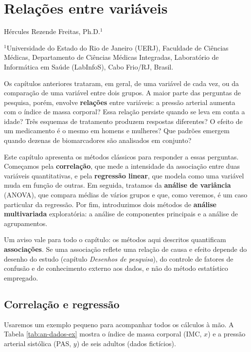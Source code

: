 \documentclass[
]{book}
\begin{document}
\chapter{Relações entre variáveis}\label{anuxe1lise-de-dados}

Hércules Rezende Freitas, Ph.D.\(^1\)

\(^1\)Universidade do Estado do Rio de Janeiro (UERJ), Faculdade de Ciências Médicas, Departamento de Ciências Médicas Integradas, Laboratório de Informática em Saúde (LabInfoS), Cabo Frio/RJ, Brasil.

Os capítulos anteriores trataram, em geral, de uma variável de cada vez, ou da comparação de uma variável entre dois grupos. A maior parte das perguntas de pesquisa, porém, envolve \textbf{relações} entre variáveis: a pressão arterial aumenta com o índice de massa corporal? Essa relação persiste quando se leva em conta a idade? Três esquemas de tratamento produzem respostas diferentes? O efeito de um medicamento é o mesmo em homens e mulheres? Que padrões emergem quando dezenas de biomarcadores são analisados em conjunto?

Este capítulo apresenta os métodos clássicos para responder a essas perguntas. Começamos pela \textbf{correlação}, que mede a intensidade da associação entre duas variáveis quantitativas, e pela \textbf{regressão linear}, que modela como uma variável muda em função de outras. Em seguida, tratamos da \textbf{análise de variância} (ANOVA), que compara médias de vários grupos e que, como veremos, é um caso particular da regressão. Por fim, introduzimos dois métodos de \textbf{análise multivariada} exploratória: a análise de componentes principais e a análise de agrupamentos.

Um aviso vale para todo o capítulo: os métodos aqui descritos quantificam \textbf{associações}. Se uma associação reflete uma relação de causa e efeito depende do desenho do estudo (capítulo \emph{Desenhos de pesquisa}), do controle de fatores de confusão e de conhecimento externo aos dados, e não do método estatístico empregado.

\section{Correlação e regressão}\label{correlauxe7uxe3o-e-regressuxe3o}

Usaremos um exemplo pequeno para acompanhar todos os cálculos à mão. A Tabela \ref{tab:an-dados-ex} mostra o índice de massa corporal (IMC, \(x\)) e a pressão arterial sistólica (PAS, \(y\)) de seis adultos (dados fictícios).
\end{document}
